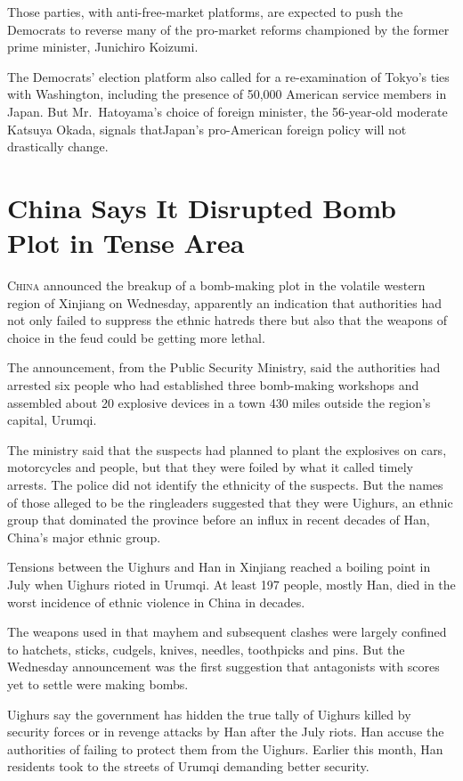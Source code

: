 ﻿\documentclass[12pt]{article}
\begin{document}
Those parties, with anti-free-market platforms, are expected to push the Democrats to reverse many
of the pro-market reforms championed by the former prime minister, Junichiro Koizumi.

The Democrats' election platform also called for a re-examination of Tokyo's ties with Washington,
including the presence of 50,000 American service members in Japan. But Mr.~Hatoyama's choice of
foreign minister, the 56-year-old moderate Katsuya Okada, signals thatJapan's pro-American foreign
policy will not drastically change.

\section{China Says It Disrupted Bomb Plot in Tense Area}

\lettrine{C}{hina} announced the breakup of a bomb-making plot in the volatile western region of
Xinjiang on Wednesday, apparently an indication that authorities had not only failed to suppress the
ethnic hatreds there but also that the weapons of choice in the feud\cite{feud} could be getting
more lethal\cite{lethal}.

The announcement, from the Public Security Ministry, said the authorities had arrested six people
who had established three bomb-making workshops and assembled about 20 explosive devices in a town
430 miles outside the region's capital, Urumqi.

The ministry said that the suspects had planned to plant the explosives on cars, motorcycles and
people, but that they were foiled by what it called timely arrests. The police did not identify the
ethnicity of the suspects. But the names of those alleged to be the ringleaders suggested that they
were Uighurs, an ethnic group that dominated the province before an influx\cite{influx} in recent
decades of Han, China's major ethnic group.

Tensions between the Uighurs and Han in Xinjiang reached a boiling point in July when Uighurs rioted
in Urumqi. At least 197 people, mostly Han, died in the worst incidence of ethnic violence in China
in decades.

The weapons used in that mayhem\cite{mayhem} and subsequent clashes were largely confined to
hatchets, sticks, cudgels\cite{cudgel}, knives, needles, toothpicks and pins. But the Wednesday
announcement was the first suggestion that antagonists with scores yet to settle were making bombs.

Uighurs say the government has hidden the true tally\cite{tally} of Uighurs killed by security
forces or in revenge attacks by Han after the July riots. Han accuse the authorities of failing to
protect them from the Uighurs. Earlier this month, Han residents took to the streets of Urumqi
demanding better security.
\end{document}
